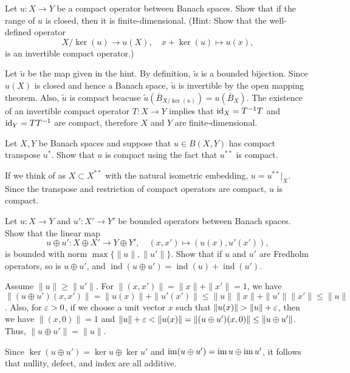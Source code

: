 \documentclass{../../small}
\newcommand{\ind}{\operatorname{ind}}
\begin{document}
\begin{prb}
Let $u:X\to Y$ be a compact operator between Banach spaces.
Show that if the range of $u$ is closed, then it is finite-dimensional.
(Hint: Show that the well-defined operator
\[X/\ker(u)\to u(X),\quad x+\ker(u)\mapsto u(x),\]
is an invertible compact operator.)
\end{prb}
\begin{sol}
Let $\tilde u$ be the map given in the hint.
By definition, $\tilde u$ is a bounded bijection.
Since $u(X)$ is closed and hence a Banach space, $\tilde u$ is invertible by the open mapping theorem.
Also, $\tilde u$ is compact beacuse $\tilde u(\bar B_{X/\ker(u)})=u(\bar B_X)$.
The existence of an invertible compact operator $T:X\to Y$ implies that $\operatorname{id}_X=T^{-1}T$ and $\operatorname{id}_Y=TT^{-1}$ are compact, therefore $X$ and $Y$ are finite-dimensional.
\end{sol}


\begin{prb}
Let $X,Y$ be Banach spaces and suppose that $u\in B(X,Y)$ has compact transpose $u^*$.
Show that $u$ is compact using the fact that $u^{**}$ is compact.
\end{prb}
\begin{sol}
If we think of as $X\subset X^{**}$ with the natural isometric embedding, $u=u^{**}|_X$.
Since the transpose and restriction of compact operators are compact, $u$ is compact.
\end{sol}


\begin{prb}
Let $u:X\to Y$ and $u':X'\to Y'$ be bounded operators between Banach spaces.
Show that the linear map
\[u\oplus u':X\oplus X'\to Y\oplus Y',\quad(x,x')\mapsto(u(x), u'(x')),\]
is bounded with norm $\max\{\|u\|,\|u'\|\}$.
Show that if $u$ and $u'$ are Fredholm operators, so is $u\oplus u'$, and $\ind(u\oplus u')=\ind(u)+\ind(u')$.
\end{prb}
\begin{sol}
Assume $\|u\|\ge\|u'\|$.
For $\|(x,x')\|=\|x\|+\|x'\|=1$, we have $\|(u\oplus u')(x,x')\|=\|u(x)\|+\|u'(x')\|\le\|u\|\|x\|+\|u'\|\|x'\|\le\|u\|$.
Also, for $\varepsilon>0$, if we choose a unit vector $x$ such that $\|u(x)\|>\|u\|+\e$, then we have $\|(x,0)\|=1$ and $\|u\|+\varepsilon<\|u(x)\|=\|(u\oplus u')(x,0)\|\le\|u\oplus u'\|$.
Thus, $\|u\oplus u'\|=\|u\|$.

Since $\ker(u\oplus u')=\ker u\oplus\ker u'$ and $\operatorname{im}(u\oplus u')=\operatorname{im} u\oplus\operatorname{im} u'$, it follows that nullity, defect, and index are all additive.
\end{sol}
\end{document}

